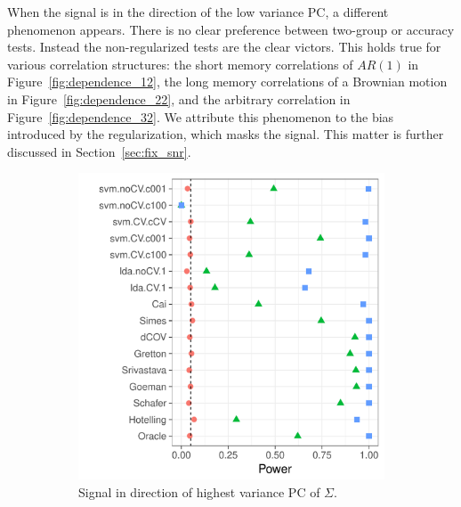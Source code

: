 \documentclass[onecolumn,draftclsnofoot]{IEEEtran}
\begin{document}
When the signal is in the direction of the low variance PC, a different phenomenon appears.
There is no clear preference between two-group or accuracy tests.
Instead the non-regularized tests are the clear victors. 
This holds true for various correlation structures: the short memory correlations of $AR(1)$ in Figure~\ref{fig:dependence_12}, the long memory correlations of a Brownian motion in Figure~\ref{fig:dependence_22}, and the arbitrary correlation in Figure~\ref{fig:dependence_32}.
We attribute this phenomenon to the bias introduced by the regularization, which masks the signal.
This matter is further discussed in Section~\ref{sec:fix_snr}.

\begin{figure}[h]
	\centering
	\caption{Short memory, AR(1) correlation. 
		$\Sigma_{k,l}=\rho^{|k-l|}; \rho=0.6$}	
	\label{fig:dependence_1}
	\begin{subfigure}[t]{.45\columnwidth}
		\centering
		\includegraphics[width=1\columnwidth]{"art/file20"}
		\caption{Signal in direction of highest variance PC of $\Sigma$.} 
		\label{fig:dependence_11}
	\end{subfigure}
	\begin{subfigure}[t]{.45\columnwidth}
		\centering

\end{subfigure}
\end{figure}
\end{document}
